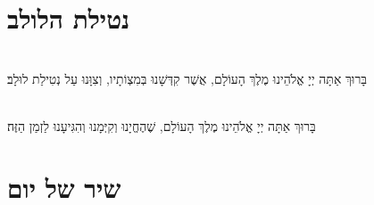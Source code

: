 \documentclass[twoside, openany, parskip=half, 11pt]{book}
\begin{document}
\shabboskiddushhayom{} 

\sepline

\label{ytshacharit}

\ytkiddushhayom{}

\sepline

\retzeh

\yaalehveyavo

\zion

\modim

\shabboschanukah

\shabboshodos


\shabbossimshalom

\tachanunim


\\
\\

\section[נטילת הלולב]{ נטילת הלולב }
\label{lulav}
\\
בָּרוּךְ אַתָּה יְיָ אֱלֹהֵינוּ מֶלֶךְ הָעוֹלָם, אֲשֶׁר קִדְּשָׁנוּ בְּמִצְוֹתָיו, וְצִוָּנוּ עַל נְטִילַת לוּלָב׃



\\
בָּרוּךְ אַתָּה יְיָ אֱלֹהֵינוּ מֶלֶךְ הָעוֹלָם, שֶׁהֶחֱיָנוּ וְקִיְּמָנוּ וְהִגִּיעָנוּ לַזְמַן הַזֶּה׃
\\
\let\clearpage\relax{

}


\vfill
\label{shacharitShabbatYTtitkabel}
\fullkaddish
\section[שיר של יום]{ שיר של יום‎ }
\weekdayshir
\end{document}
